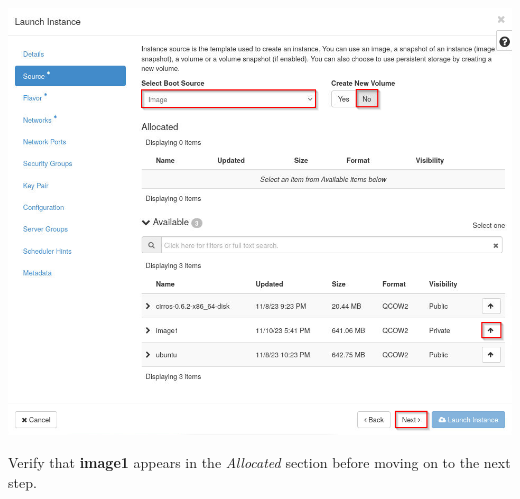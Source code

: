 \documentclass[letterpaper, 12pt]{article}
\begin{document}
\begin{enumerate}
    \begin{center}
        \includegraphics[width=\linewidth]{images/part4/step4.png}
    \end{center}

    \begin{stopbox}{}
        Verify that \textbf{image1} appears in the \textit{Allocated} section before moving on to the next step.
    \end{stopbox}


\end{enumerate}
\end{document}
